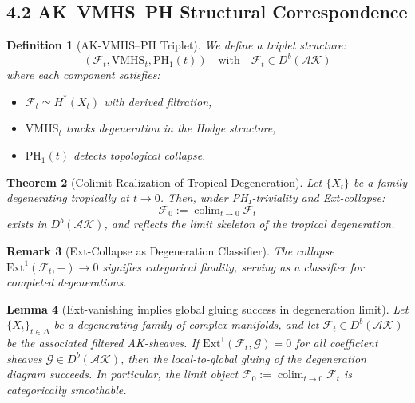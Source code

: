 \documentclass[11pt]{article}
\DeclareMathOperator{\colim}{colim}
\newtheorem{theorem}{Theorem}[section]
\newtheorem{definition}[theorem]{Definition}
\newtheorem{remark}[theorem]{Remark}
\newtheorem{lemma}[theorem]{Lemma}
\begin{document}
\subsection{4.2 AK--VMHS--PH Structural Correspondence}

\begin{definition}[AK-VMHS--PH Triplet]
We define a triplet structure:
\[
(\mathcal{F}_t, \mathrm{VMHS}_t, \mathrm{PH}_1(t)) \quad \text{with} \quad \mathcal{F}_t \in D^b(\mathcal{AK})
\]
where each component satisfies:
\begin{itemize}
    \item \( \mathcal{F}_t \simeq H^*(X_t) \) with derived filtration,
    \item \( \mathrm{VMHS}_t \) tracks degeneration in the Hodge structure,
    \item \( \mathrm{PH}_1(t) \) detects topological collapse.
\end{itemize}
\end{definition}

\begin{theorem}[Colimit Realization of Tropical Degeneration]
Let \( \{X_t\} \) be a family degenerating tropically at \( t \to 0 \). Then, under PH₁-triviality and Ext-collapse:
\[
\mathcal{F}_0 := \colim_{t \to 0} \mathcal{F}_t
\]
exists in \( D^b(\mathcal{AK}) \), and reflects the limit skeleton of the tropical degeneration.
\end{theorem}

\begin{remark}[Ext-Collapse as Degeneration Classifier]
The collapse \( \mathrm{Ext}^1(\mathcal{F}_t, -) \to 0 \) signifies categorical finality, serving as a classifier for completed degenerations.
\end{remark}

\begin{lemma}[Ext-vanishing implies global gluing success in degeneration limit]
Let \( \{X_t\}_{t \in \Delta} \) be a degenerating family of complex manifolds,  
and let \( \mathcal{F}_t \in D^b(\mathcal{AK}) \) be the associated filtered AK-sheaves.  
If \( \mathrm{Ext}^1(\mathcal{F}_t, \mathcal{G}) = 0 \) for all coefficient sheaves \( \mathcal{G} \in D^b(\mathcal{AK}) \), then the local-to-global gluing of the degeneration diagram succeeds.  
In particular, the limit object \( \mathcal{F}_0 := \colim_{t \to 0} \mathcal{F}_t \) is categorically smoothable.
\end{lemma}
\end{document}
